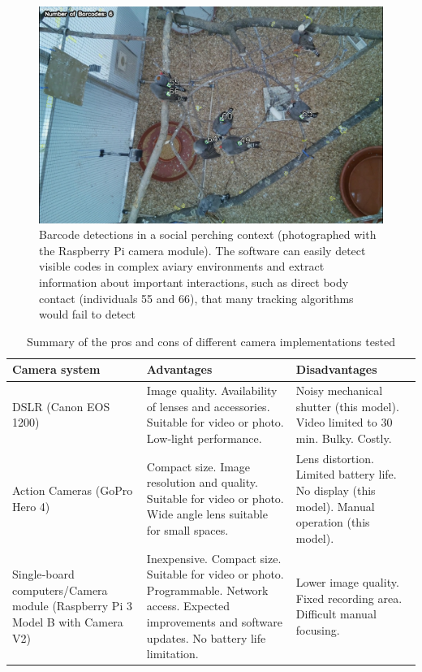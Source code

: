 \documentclass[11pt,a4paper,oneside]{book}
\begin{document}
\begin{doublespace}
\begin{figure}[!htb]
    \centering
    \includegraphics{Graving_IMPRS_Thesis/figures/bird_figure_4.jpg}
    \caption{Barcode detections in a social perching context (photographed with the Raspberry Pi camera module). The software can easily detect visible codes in complex aviary environments and extract information about important interactions, such as direct body contact (individuals 55 and 66), that many tracking algorithms would fail to detect
}
    \label{fig:bird_figure_4}
\end{figure}
\begin{table}[!htb]
\caption{Summary of the pros and cons of different camera implementations tested}
    \begin{tabular}{| m{} | m{} | m{} |}
    \hline
         \textbf{Camera system} & \textbf{Advantages} & \textbf{Disadvantages} \\ \hline
         DSLR (Canon EOS 1200)	& Image quality. Availability of lenses and accessories. Suitable for video or photo. Low‐light performance.	& Noisy mechanical shutter (this model). Video limited to 30 min. Bulky. Costly. \\ \hline
         Action Cameras (GoPro Hero 4)	& Compact size. Image resolution and quality. Suitable for video or photo. Wide angle lens suitable for small spaces.	& Lens distortion. Limited battery life. No display (this model). Manual operation (this model). \\ \hline
         Single‐board computers/Camera module (Raspberry Pi 3 Model B with Camera V2)	&
         Inexpensive. Compact size. Suitable for video or photo. Programmable. Network access. Expected improvements and software updates. No battery life limitation.	& Lower image quality. Fixed recording area. Difficult manual focusing. \\
         \hline
    \end{tabular}
\label{table:bird_table}
\end{table}


\end{doublespace}
\end{document}
